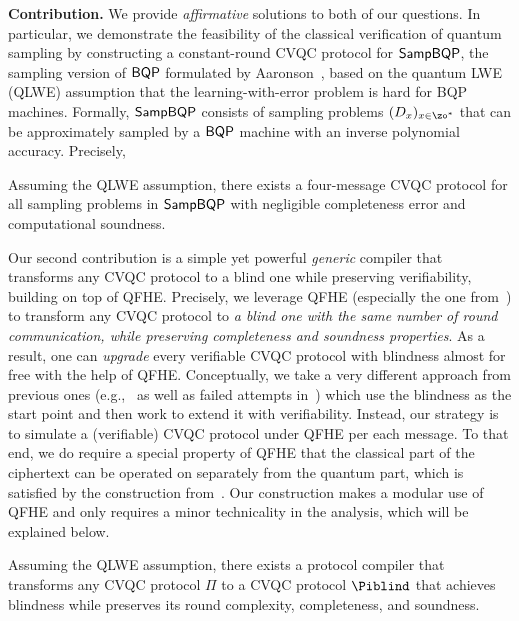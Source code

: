 \vspace{2mm} \noindent \textbf{Contribution.} We provide \emph{affirmative} solutions to both of our questions.
In particular, we demonstrate the feasibility of the classical verification of quantum sampling by
constructing a constant-round CVQC protocol for $\operatorname{\mathsf{SampBQP}}$, the sampling version of $\operatorname{\mathsf{BQP}}$ formulated by Aaronson~\cite{aaronson_2013}, based on the quantum LWE (QLWE) assumption that the learning-with-error problem is hard for BQP machines. 
Formally, $\operatorname{\mathsf{SampBQP}}$ consists of sampling problems $(D_x)_{x\in\zo^*}$ that can be approximately sampled by a $\operatorname{\mathsf{BQP}}$ machine with an inverse polynomial accuracy.   %
Precisely,
\begin{theorem}[informal]
Assuming the QLWE assumption, there exists a four-message CVQC protocol for all sampling problems in $\operatorname{\mathsf{SampBQP}}$ with negligible completeness error and computational soundness.
\end{theorem}

Our second contribution is a simple yet powerful \emph{generic}  compiler that transforms any CVQC protocol to a blind one while preserving verifiability, building on top of QFHE. 
Precisely, we leverage QFHE (especially the one from~\cite{mahadev_qfhe}) to transform any CVQC protocol to \emph{a blind one with the same number of round communication, while preserving completeness and soundness properties}.
As a result, one can \emph{upgrade} every verifiable CVQC protocol with blindness almost for free with the help of QFHE.
Conceptually, we take a very different approach from previous ones  (e.g.,~\cite{FK17} as well as failed attempts in~\cite{mahadev_2018}) which use the blindness as the start point and then work to extend it with verifiability.
Instead, our strategy is to simulate a (verifiable) CVQC protocol under QFHE per each message.
To that end, we do require a special property of QFHE that the classical part of the ciphertext can be operated on separately from the quantum part, which is satisfied by the construction from~\cite{mahadev_qfhe}.
Our construction makes a modular use of QFHE and only requires a minor technicality in the analysis, which will be explained below. 
\begin{theorem}[informal]
Assuming the QLWE assumption, there exists a protocol compiler that transforms any CVQC protocol $\Pi$ to a CVQC protocol $\Piblind$ that achieves blindness while preserves its round complexity, completeness, and soundness.
\end{theorem}

